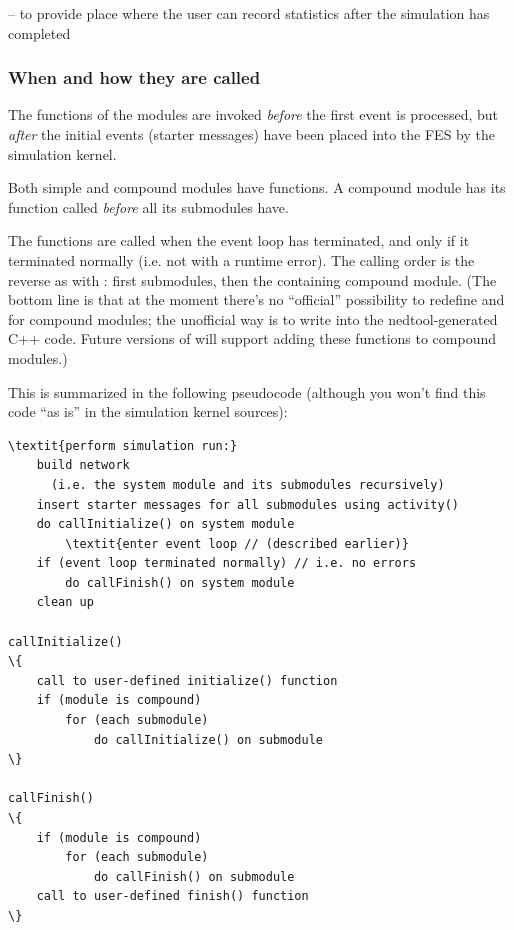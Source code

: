  -- to provide place where the user can record statistics
after the simulation has completed


\subsubsection{When and how they are called}


The  functions of the modules are invoked
\textit{before} the first event is processed, but \textit{after} the
initial events (starter messages) have been
placed into the FES by the simulation kernel.


Both simple and compound modules have  functions.
A compound module has its  function called
\textit{before} all its submodules have.


The  functions are called when the event
loop has terminated, and only if it terminated
normally (i.e. not with a runtime error).  The calling order is the
reverse as with : first submodules, then the
containing compound module. (The bottom line is that at the moment
there's no ``official'' possibility to redefine 
and  for compound modules; the unofficial way is to
write into the nedtool-generated C++ code. Future versions of {\opp} will
support adding these functions to compound modules.)

This is summarized in the following pseudocode (although you
won't find this code ``as is'' in the simulation
kernel sources):


\begin{Verbatim}[commandchars=\\\{\}]
\textit{perform simulation run:}
    build network
      (i.e. the system module and its submodules recursively)
    insert starter messages for all submodules using activity()
    do callInitialize() on system module
        \textit{enter event loop // (described earlier)}
    if (event loop terminated normally) // i.e. no errors
        do callFinish() on system module
    clean up

callInitialize()
\{
    call to user-defined initialize() function
    if (module is compound)
        for (each submodule)
            do callInitialize() on submodule
\}

callFinish()
\{
    if (module is compound)
        for (each submodule)
            do callFinish() on submodule
    call to user-defined finish() function
\}
\end{Verbatim}



